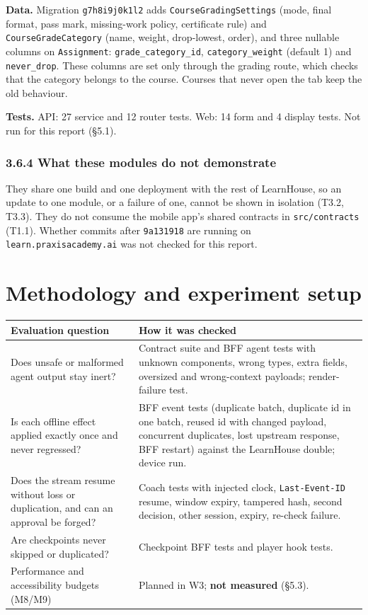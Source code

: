 \documentclass[11pt,a4paper]{article}
\newcommand{\fp}[1]{\nolinkurl{#1}}
\begin{document}
\textbf{Data.} Migration \texttt{g7h8i9j0k1l2} adds \texttt{CourseGradingSettings} (mode, final format,
pass mark, missing-work policy, certificate rule) and \texttt{CourseGradeCategory} (name, weight,
drop-lowest, order), and three nullable columns on \texttt{Assignment}: \texttt{grade\_category\_id},
\texttt{category\_weight} (default 1) and \texttt{never\_drop}. These columns are set only through the
grading route, which checks that the category belongs to the course. Courses that never open the tab
keep the old behaviour.

\textbf{Tests.} API: 27 service and 12 router tests. Web: 14 form and 4 display tests. Not run for this
report (§5.1).

\subsubsection*{3.6.4 What these modules do not demonstrate}
They share one build and one deployment with the rest of LearnHouse, so an update to one module, or a
failure of one, cannot be shown in isolation (T3.2, T3.3). They do not consume the mobile app's shared
contracts in \fp{src/contracts} (T1.1). Whether commits after \texttt{9a131918} are running on
\texttt{learn.praxisacademy.ai} was not checked for this report.

\section{Methodology and experiment setup}
\begin{xltabular}{\textwidth}{L{0.27\textwidth}Y}
\toprule
\textbf{Evaluation question} & \textbf{How it was checked} \\
\midrule
Does unsafe or malformed agent output stay inert? & Contract suite and BFF agent tests with unknown components, wrong types, extra fields, oversized and wrong-context payloads; render-failure test. \\
Is each offline effect applied exactly once and never regressed? & BFF event tests (duplicate batch, duplicate id in one batch, reused id with changed payload, concurrent duplicates, lost upstream response, BFF restart) against the LearnHouse double; device run. \\
Does the stream resume without loss or duplication, and can an approval be forged? & Coach tests with injected clock, \texttt{Last-Event-ID} resume, window expiry, tampered hash, second decision, other session, expiry, re-check failure. \\
Are checkpoints never skipped or duplicated? & Checkpoint BFF tests and player hook tests. \\
Performance and accessibility budgets (M8/M9) & Planned in W3; \textbf{not measured} (§5.3). \\
\bottomrule
\end{xltabular}
\end{document}
